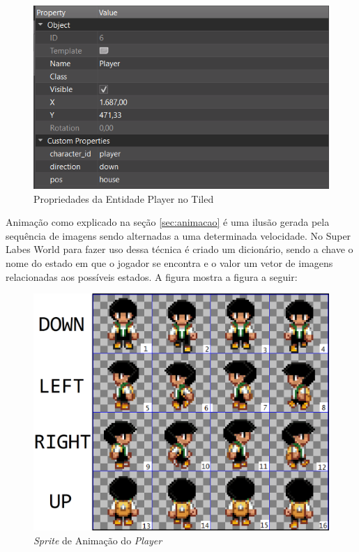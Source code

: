 \begin{figure}[h!]
    \centering
    \includegraphics[width=1\linewidth]{figuras/tiled-player-properties.png}
    \caption{Propriedades da Entidade Player no Tiled}
    \label{fig:tiled-player-properties}
\end{figure}

\clearpage
Animação como explicado na seção \ref{sec:animacao} é uma ilusão gerada pela sequência de imagens sendo alternadas a uma determinada velocidade. No Super Labes World para fazer uso dessa técnica é criado um dicionário, sendo a chave o nome do estado em que o jogador se encontra e o valor um vetor de imagens relacionadas aos possíveis estados. A figura mostra a figura a seguir:
\begin{figure}[h!]
    \centering
    \includegraphics[width=1\linewidth]{figuras/player-animation.png}
    \caption{\textit{Sprite} de Animação do \textit{Player} }
    \label{fig:player-animation}
\end{figure}

